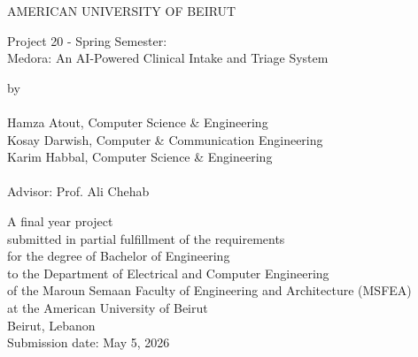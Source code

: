 \begin{titlepage}
\begin{center}

\LARGE{AMERICAN UNIVERSITY OF BEIRUT\\}
\vspace{2.4cm}

\LARGE{Project 20 - Spring Semester:\\
       Medora: An AI-Powered Clinical Intake and Triage System\\}
\vspace{1.8cm}

\normalsize{by\\ ~\\}
\Large{
        Hamza Atout, Computer Science \& Engineering\\
        Kosay Darwish, Computer \& Communication Engineering\\
        Karim Habbal, Computer Science \& Engineering\\
        ~\\
        Advisor: Prof. Ali Chehab\\
    }
\vspace{1.8cm}

\normalsize{A final year project\\}
\normalsize{submitted in partial fulfillment of the requirements\\}
\normalsize{for the degree of Bachelor of Engineering\\}
\small{to the Department of Electrical and Computer Engineering\\}
\normalsize{of the Maroun Semaan Faculty of Engineering and Architecture (MSFEA)\\}
\normalsize{at the American University of Beirut\\}
\normalsize{Beirut, Lebanon\\}
\vspace{1.2cm}
\normalsize{Submission date: May 5, 2026}

\end{center}
\end{titlepage}
